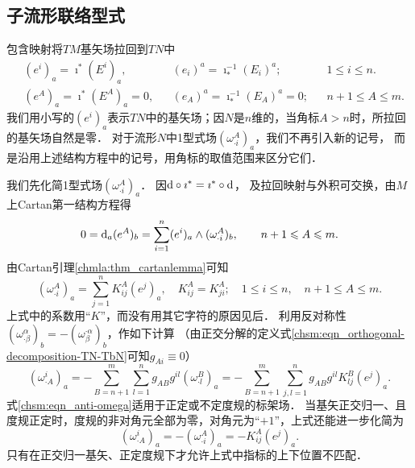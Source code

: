 \subsection{子流形联络型式}
包含映射将$TM$基矢场拉回到$TN$中
\begin{align}
    &(e^i)_a = \imath^* (E^i)_a, &{}& (e_i)^a = \imath_*^{-1} (E_i)^a; &{}&  1 \leqslant i \leqslant n. \\
    &(e^A)_a = \imath^* (E^A)_a=0, &{}&  (e_A)^a = \imath_*^{-1} (E_A)^a=0;&{}&
    n+1 \leqslant A \leqslant m. \label{chsm:eqn_base-tmp1}
\end{align}
我们用小写的$(e^i)_a$表示$TN$中的基矢场；因$N$是$n$维的，当角标$A>n$时，所拉回的基矢场自然是零．
对于流形$N$中1型式场$(\omega _{\cdot i}^A)_a$，我们不再引入新的记号，
而是沿用上述结构方程中的记号，用角标的取值范围来区分它们．


我们先化简1型式场$(\omega _{\cdot i}^A)_a$．
因${\rm d}\circ \imath^* = \imath^* \circ {\rm d}$，
及拉回映射与外积可交换，由$M$上Cartan第一结构方程得
\begin{equation}
    0 ={\rm d}_a(e^A)_b=\sum_{i=1}^{n}(e^i)_a \wedge (\omega _{\cdot i}^A)_b ,
    \qquad  n+1 \leqslant A \leqslant m .
\end{equation}
由Cartan引理\ref{chmla:thm_cartanlemma}可知
\begin{equation}\label{chsm:eqn_omega-Kija}
    (\omega _{\cdot i}^A)_a= \sum_{j=1}^{n} K^{A}_{ij}(e^j)_a, \quad K^{A}_{ij}=K^{A}_{ji};
    \quad 1 \leqslant i \leqslant n,\quad  n+1 \leqslant A \leqslant m .
\end{equation}
上式中的系数用“$K$”，而没有用其它字符的原因见后．
利用反对称性$(\omega _{\cdot \beta}^\alpha)_b =-(\omega _{\beta}^{\cdot \alpha})_b$，作如下计算
（由正交分解的定义式\eqref{chsm:eqn_orthogonal-decomposition-TN-TbN}可知$g_{A i}\equiv 0$）
\begin{equation}\label{chsm:eqn_anti-omega}
    (\omega _{\cdot A}^i)_a
    = -\sum_{B=n+1}^{m}\sum_{l=1}^{n}g_{A B} g^{il} (\omega _{\cdot l}^B)_a
    = -\sum_{B=n+1}^{m}\sum_{j,l=1}^{n}g_{A B} g^{il} K_{lj}^B (e^j)_a .
\end{equation}
式\eqref{chsm:eqn_anti-omega}适用于正定或不定度规的标架场．
当基矢正交归一、且度规正定时，度规的非对角元全部为零，对角元为“$+1$”，上式还能进一步化简为
\begin{equation}\label{chsm:eqn_anti-omega-positive}
    (\omega _{\cdot A}^i)_a= -(\omega _{\cdot i}^A)_a
    = -K_{ij}^A (e^j)_a .
\end{equation}
只有在正交归一基矢、正定度规下才允许上式中指标的上下位置不匹配．

